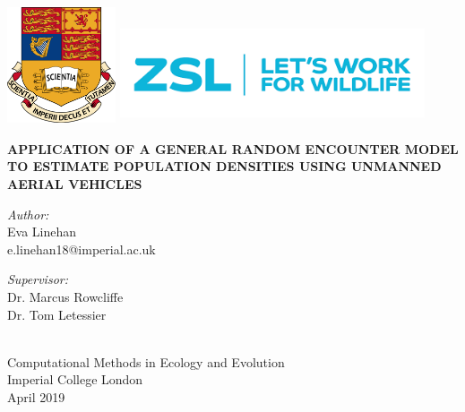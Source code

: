 \documentclass[11pt]{article}
\begin{document}
\begin{titlepage}
	\includegraphics[height = 35mm, width = 32mm]{../Writeup/crest.png}%
	\hfill
	\includegraphics[height = 30mm, width = 90mm]{../Writeup/zsl.png}
	
		\centering
		
		\vspace{5cm}
		{\uppercase{\textbf{\LARGE Application of a General Random Encounter Model to Estimate Population Densities Using Unmanned Aerial Vehicles \\}}}
		\vspace{6cm}
		\begin{minipage}[t]{0.4\textwidth}
			\begin{flushleft} \large
				\emph{Author:} \\
				Eva Linehan\\
				e.linehan18@imperial.ac.uk
			\end{flushleft}
		\end{minipage}
		\begin{minipage}[t]{0.4\textwidth}
			\begin{flushright} \large
				\emph{Supervisor:} \\
				Dr. Marcus Rowcliffe \\
				Dr. Tom Letessier
			\end{flushright}
		\end{minipage}\\[3cm]
		
		Computational Methods in Ecology and Evolution\\
		Imperial College London\\
		April 2019\\
\end{titlepage}
\end{document}
